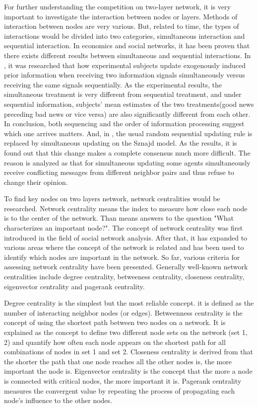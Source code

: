 For further understanding the competition on two-layer network, it is very important to investigate the interaction between nodes or layers. Methods of interaction between nodes are very various.\cite{sirbu2017} But, related to time, the types of interactions  would be divided into two categories, simultaneous interaction and sequential interaction. In economics and social networks, it has been proven that there exists different results between simultaneous and sequential interactions.\cite{hoffman2011, dietrich2004} In \cite{hoffman2011}, it was researched that how experimental subjects update exogenously induced prior information when receiving two information signals simultaneously versus receiving the same signals sequentially. As the experimental results, the simultaneous treatment is very different from sequential treatment, and under sequential information,  subjects’ mean estimates of the two treatments(good news preceding bad news or vice versa) are also significantly different from each other. In conclusion, both sequencing and the order of information processing suggest which one arrives matters. 
And, in \cite{dietrich2004}, the usual random sequential updating rule is replaced  by simultaneous updating on the Sznajd model. As the results, it is found out that this change makes a complete consensus much more difficult. The reason is analyzed as that for simultaneous updating some agents simultaneously receive conflicting messages from different neighbor pairs and thus refuse to change their opinion.

To find key nodes on two layers network, network centralities would be researched.
Network centrality means the index to measure how close each node is to the center of the network. Than means answers to the question "What characterizes an important node?". The concept of network centrality was first introduced in the field of social network analysis.\cite{freeman1979} After that, it has expanded to various areas where the concept of the network is related and has been used to identify which nodes are important in the network. So far, various criteria for assessing network centrality have been presented. Generally well-known network centralities include degree centrality, betweeness centrality, closeness centrality, eigenvector centrality and pagerank centrality.\cite{koschutzki2008}

Degree centrality is the simplest but the most reliable concept. it is defined as the number of interacting neighbor nodes (or edges). Betweenness centrality is the concept of using the shortest path between two nodes on a network. It is explained as the concept to  define two different node sets on the network (set 1, 2) and quantify how often each node appears on the shortest path for all combinations of nodes in set 1 and set 2. Closeness centrality is derived from that the shorter the path that one node reaches all the other nodes is, the more important the node is. Eigenvector centrality is the concept that the more a node is connected with critical nodes, the more important it is. Pagerank centrality measures the convergent value by repeating the process of propagating each node's influence to the other nodes.    

